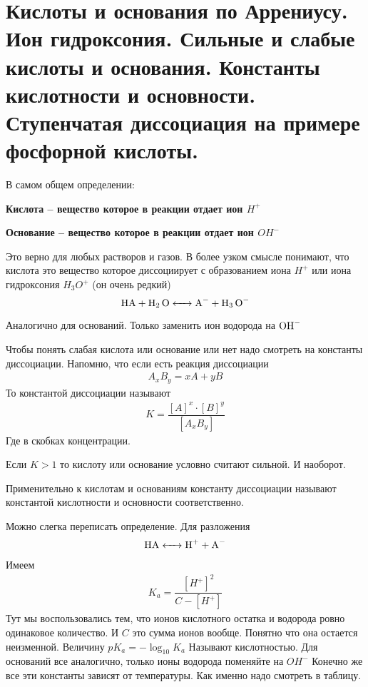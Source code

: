 \section{Кислоты и основания по Аррениусу. Ион гидроксония. Сильные и слабые кислоты и основания. Константы кислотности и основности. Ступенчатая диссоциация на примере фосфорной кислоты.}
	В самом общем определении:
	
	\textbf{Кислота -- вещество которое в реакции отдает ион $H^+$ }
	
	
	\textbf{Основание -- вещество которое в реакции отдает ион $OH^-$}
	
	Это верно для любых растворов и газов. В более узком смысле понимают, что кислота это вещество которое диссоциирует с образованием иона $H^+$ или иона гидроксония $H_3 O^+$ (он очень редкий)
	\begin{equation*}
	\ce{HA + H_2 O <-> A^- + H_3 O^- }
	\end{equation*}
	
	Аналогично для оснований. Только заменить ион водорода на $\ce{OH^-}$
	
	Чтобы понять слабая кислота или основание или нет надо смотреть на константы диссоциации. Напомню, что если есть реакция диссоциации
	\begin{align*}
	A_x B_y = x A + y B
	\end{align*} 
	То константой диссоциации называют
	\begin{align*}
	K = \dfrac{[A]^x \cdot [B]^y}{[A_x B_y]}
	\end{align*}
	Где в скобках концентрации.
	
	Если $K > 1$ то кислоту или  основание условно считают сильной. И наоборот.
	
	Применительно к кислотам и основаниям константу диссоциации называют константой кислотности и основности соответственно. 
	
	Можно слегка переписать определение. Для разложения 
	\begin{align*}
	\ce{HA <-> H^+ + A^-}
	\end{align*}
	Имеем
	\begin{align}
	K_a = \dfrac{[H^+]^2}{C - [H^+]}
	\end{align}
	Тут мы воспользовались тем, что ионов кислотного остатка и водорода ровно одинаковое количество. И $C$ это сумма ионов вообще. Понятно что она остается неизменной. Величину $pK_a = -\log_{10} K_a$ Называют кислотностью. Для оснований все аналогично, только ионы водорода поменяйте на $OH^-$ Конечно же все эти константы зависят от температуры. Как именно надо смотреть в таблицу.
	
